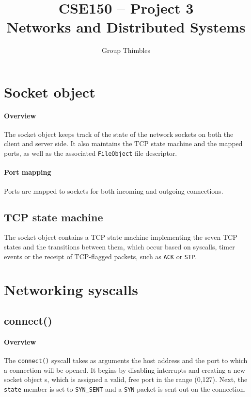 \documentclass[]{article}
\title{CSE150 -- Project 3\\ Networks and Distributed Systems}
\author{Group Thimbles}
\begin{document}
\maketitle
\tableofcontents

\section{Socket object}
\paragraph{Overview}
The socket object keeps track of the state of the network sockets on both the client and server side. It also maintains the TCP state machine and the mapped ports, as well as the associated \texttt{FileObject} file descriptor.

\paragraph{Port mapping}
Ports are mapped to sockets for both incoming and outgoing connections.

\subsection{TCP state machine}

The socket object contains a TCP state machine implementing the seven TCP states and the transitions between them, which occur based on syscalls, timer events or the receipt of TCP-flagged packets, such as \texttt{ACK} or \texttt{STP}.

\section{Networking syscalls}
\subsection{connect()}

\paragraph{Overview}
The \texttt{connect()} syscall takes as arguments the host address and the port to which a connection will be opened. It begins by disabling interrupts and creating a new socket object s, which is assigned a valid, free port in the range (0,127). Next, the \texttt{state} member is set to \texttt{SYN\_SENT} and a \texttt{SYN} packet is sent out on the connection. 
\end{document}

